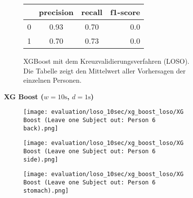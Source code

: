 \begin{figure}[H]
    \begin{subfigure}{1\textwidth}
        \begin{center}
            \begin{tabular}{ | l | c | c | r | }
              \hline
               & precision & recall & f1-score \\ \hline
              0 & 0.93 & 0.70 & 0.0 \\ \hline
              1 & 0.70 & 0.73 & 0.0 \\
              \hline
            \end{tabular}
        \end{center}
        \caption{XGBoost mit dem Kreuzvalidierungsverfahren (LOSO). Die Tabelle zeigt den Mittelwert aller Vorhersagen der einzelnen Personen.}
        \label{implementation:app:screenshots:user_studies_information}
    \end{subfigure}
    \newline
    \vspace*{1 cm}
    \newline
    \textbf{XG Boost ($w=10\si{\s}$, $d=1\si{\s}$)}
    \begin{subfigure}{1\textwidth}
      \texttt{[image: evaluation/loso\_10sec/xg\_boost\_loso/XG Boost (Leave one Subject out: Person 6 back).png]}
    \end{subfigure}
    \begin{subfigure}{1\textwidth}
      \texttt{[image: evaluation/loso\_10sec/xg\_boost\_loso/XG Boost (Leave one Subject out: Person 6 side).png]}
    \end{subfigure}
    \begin{subfigure}{1\textwidth}
      \texttt{[image: evaluation/loso\_10sec/xg\_boost\_loso/XG Boost (Leave one Subject out: Person 6 stomach).png]}
  \end{subfigure}


\end{figure}
